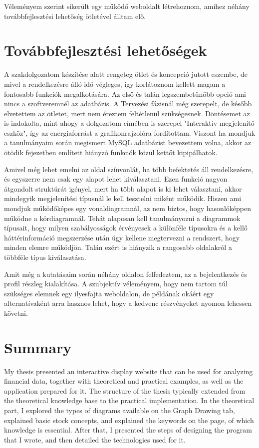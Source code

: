 	Véleményem szerint sikerült egy működő weboldalt létrehoznom, amihez néhány továbbfejlesztési lehetőség ötletével álltam elő.

\section{Továbbfejlesztési lehetőségek}

A szakdolgozatom készítése alatt rengeteg ötlet és koncepció jutott eszembe, de mivel a rendelkezésre álló idő végleges, így korlátoznom kellett magam a fontosabb funkciók megalkotására. Az első és talán legszembetűnőbb opció ami nincs a szoftveremnél az adatbázis. A Tervezési fázisnál még szerepelt, de később elvetettem az ötletet, mert nem éreztem feltétlenül szükségesnek. Döntésemet az is indokolta, mint ahogy a dolgozatom címében is szerepel "Interaktív megjelenítő eszköz", így az energiaforrást a grafikonrajzolóra fordítottam. Viszont ha mondjuk a tanulmányaim során megismert MySQL adatbázist bevezettem volna, akkor az ötödik fejezetben említett hiányzó funkciók közül kettőt kipipálhatok.

	Amivel még lehet emelni az oldal színvonlát, ha több befektetés áll rendelkezésre, és egyszerre nem csak egy alapot lehet kiválasztani. Ezen funkció nagyon átgondolt struktúrát igényel, mert ha több alapot is ki lehet választani, akkor mindegyik megjelenítési típusnál le kell tesztelni miként működik. Hiszen ami mondjuk működőképes egy vonaldiagramnál, az nem biztos, hogy hasonlóképpen működne a kördiagramnál. Tehát alaposan kell tanulmányozni a diagrammok típusait, hogy milyen szabályosságok érvényesek a különféle típusokra és a kellő háttérinformáció megszerzése után úgy kellene megtervezni a rendszert, hogy minden elemre működjön. Talán ezért is hiányzik a rangosabb oldalakról a többféle típus kiválasztása.

	Amit még a kutatásaim során néhány oldalon felfedeztem, az a bejelentkezés és profil részleg kialakítása. A szubjektív véleményem, hogy nem tartom túl szükséges elemnek egy ilyesfajta weboldalon, de példának okáért egy alternatívaként arra hasznos lehet, hogy a kedvenc részvényeket nyomon lehessen követni.

\section{Summary}

My thesis presented an interactive display website that can be used for analyzing financial data, together with theoretical and practical examples, as well as the application prepared for it. 
The structure of the thesis typically extended from the theoretical knowledge base to the practical implementation. 
In the theoretical part, I explored the types of diagrams available on the Graph Drawing tab, explained basic stock concepts, and explained the keywords on the page, of which knowledge is essential. After that, I presented the steps of designing the program that I wrote, and then detailed the technologies used for it.


